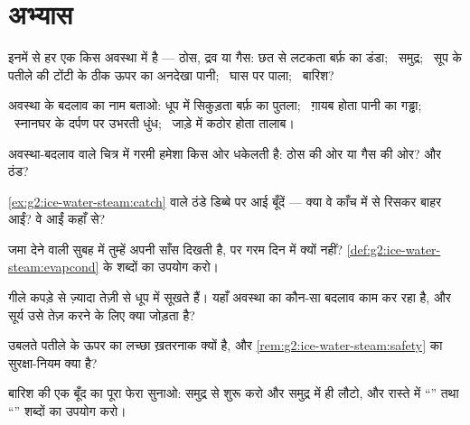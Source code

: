 \section{अभ्यास}

\begin{exercise}[$\star$]\label{exo:g2:ice-water-steam:1}
इनमें से हर एक किस अवस्था में है --- ठोस, द्रव या गैस: छत से लटकता
बर्फ़ का डंडा; \ समुद्र; \ सूप के पतीले की टोंटी के ठीक ऊपर का
अनदेखा पानी; \ घास पर पाला; \ बारिश?
\end{exercise}

\begin{exercise}[$\star$]\label{exo:g2:ice-water-steam:2}
अवस्था के बदलाव का नाम बताओ: धूप में सिकुड़ता बर्फ़ का पुतला; \
ग़ायब होता पानी का गड्ढा; \ स्नानघर के दर्पण पर उभरती धुंध; \ जाड़े
में कठोर होता तालाब।
\end{exercise}

\begin{exercise}[$\star$]\label{exo:g2:ice-water-steam:3}
अवस्था-बदलाव वाले चित्र में गरमी हमेशा किस ओर धकेलती है: ठोस की ओर
या गैस की ओर? और ठंड?
\end{exercise}

\begin{exercise}[$\star$]\label{exo:g2:ice-water-steam:4}
\cref{ex:g2:ice-water-steam:catch} वाले ठंडे डिब्बे पर आई बूँदें ---
क्या वे काँच में से रिसकर बाहर आईं? वे आईं कहाँ से?
\end{exercise}

\begin{exercise}[$\star$]\label{exo:g2:ice-water-steam:5}
जमा देने वाली सुबह में तुम्हें अपनी साँस दिखती है, पर गरम दिन में
क्यों नहीं? \cref{def:g2:ice-water-steam:evapcond} के शब्दों का
उपयोग करो।
\end{exercise}

\begin{exercise}[$\star$]\label{exo:g2:ice-water-steam:6}
गीले कपड़े  से ज़्यादा तेज़ी से धूप में सूखते हैं। यहाँ अवस्था
का कौन-सा बदलाव काम कर रहा है, और सूर्य उसे तेज़ करने के लिए क्या
जोड़ता है?
\end{exercise}

\begin{exercise}[$\star$]\label{exo:g2:ice-water-steam:7}
उबलते पतीले के ऊपर का लच्छा ख़तरनाक क्यों है, और
\cref{rem:g2:ice-water-steam:safety} का सुरक्षा-नियम क्या है?
\end{exercise}

\begin{exercise}[$\star$]\label{exo:g2:ice-water-steam:8}
बारिश की एक बूँद का पूरा फेरा सुनाओ: समुद्र से शुरू करो और समुद्र
में ही लौटो, और रास्ते में ``'' तथा ``'' शब्दों का
उपयोग करो।
\end{exercise}

